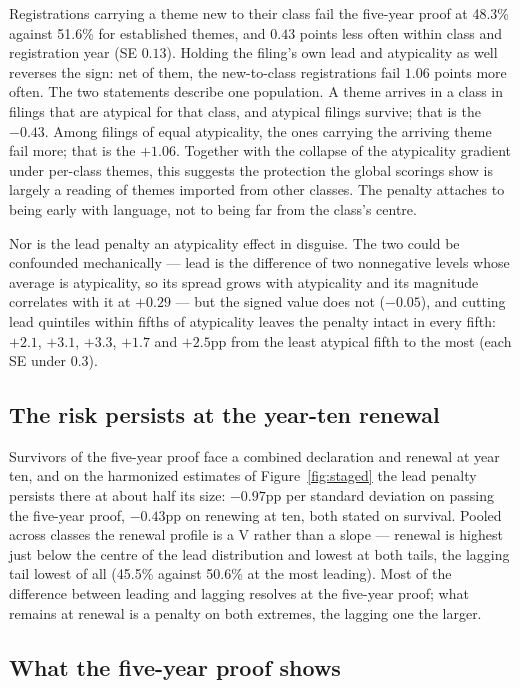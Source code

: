 Registrations carrying a theme new to their class fail the five-year proof
at 48.3\% against 51.6\% for established themes, and $0.43$ points less
often within class and registration year (SE $0.13$). Holding the
filing's own lead and atypicality as well reverses the sign: net of them,
the new-to-class registrations fail $1.06$ points more often. The two
statements describe one population. A theme arrives in a class in filings
that are atypical for that class, and atypical filings survive; that is
the $-0.43$. Among filings of equal atypicality, the ones carrying the
arriving theme fail more; that is the $+1.06$. Together with the
collapse of the atypicality gradient under per-class themes, this
suggests the protection the global scorings show is largely a reading
of themes imported from other classes. The penalty attaches to being
early with language, not to being far from the class's centre.

Nor is the lead penalty an atypicality effect in disguise. The two could
be confounded mechanically --- lead is the difference of two nonnegative
levels whose average is atypicality, so its spread grows with atypicality
and its magnitude correlates with it at $+0.29$ --- but the signed value
does not ($-0.05$), and cutting lead quintiles within fifths of
atypicality leaves the penalty intact in every fifth: $+2.1$, $+3.1$,
$+3.3$, $+1.7$ and $+2.5$pp from the least atypical fifth to the most
(each SE under $0.3$).

\subsection{The risk persists at the year-ten renewal}\label{sec:renewal}

Survivors of the five-year proof face a combined declaration and renewal
at year ten, and on the harmonized estimates of Figure~\ref{fig:staged}
the lead penalty persists there at about half its size: $-0.97$pp per
standard deviation on passing the five-year proof, $-0.43$pp on renewing
at ten, both stated on survival. Pooled across classes the renewal
profile is a V rather than a slope --- renewal is highest just below the
centre of the lead distribution and lowest at both tails, the lagging tail
lowest of all (45.5\% against 50.6\% at the most leading). Most of the
difference between leading and lagging resolves at the five-year proof;
what remains at renewal is a penalty on both extremes, the lagging one
the larger.

\subsection{What the five-year proof shows}\label{sec:gate_conclusion}

